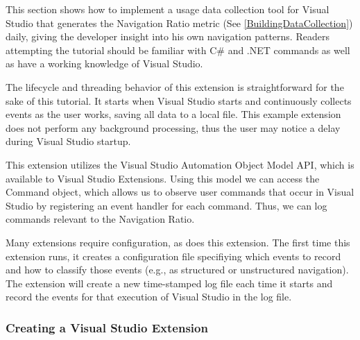 This section shows how to implement a usage data collection tool for Visual Studio that generates the Navigation Ratio metric (See \ref{BuildingDataCollection}) daily, giving the developer insight into his own navigation patterns. Readers attempting the tutorial should be familiar with C\# and .NET commands as well as have a working knowledge of Visual Studio.  

The lifecycle and threading behavior of this extension is straightforward for the sake of this tutorial. It starts when Visual Studio starts and continuously collects events as the user works, saving all data to a local file.  This example extension does not perform any background processing, thus the user may notice a delay during Visual Studio startup.  

This extension utilizes the Visual Studio Automation Object Model API, which is available to Visual Studio Extensions. Using this model we can access the Command object, which allows us to observe user commands that occur in Visual Studio by registering an event handler for each command. Thus, we can log commands relevant to the Navigation Ratio. 

Many extensions require configuration, as does this extension. The first time this extension runs, it creates a configuration file specifiying which events to record and how to classify those events (e.g., as structured or unstructured navigation).  The extension will create a new time-stamped log file each time it starts and record the events for that execution of Visual Studio in the log file. 

\subsubsection{Creating a Visual Studio Extension}

